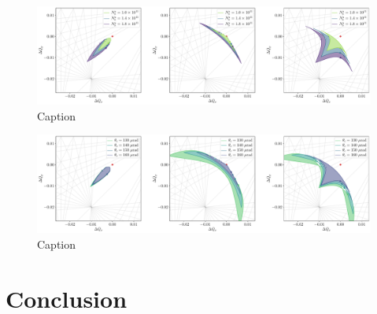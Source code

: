 \documentclass{cernatsnote}
\begin{document}
\begin{figure}[h!]
    \centering
    \includegraphics[width=\linewidth]{TeX/Figures/Nb_cmp.pdf}
    \caption{Caption}
    \label{fig:my_label}
\end{figure}

\begin{figure}[h!]
    \centering
    \includegraphics[width=\linewidth]{TeX/Figures/xing_cmp.pdf}
    \caption{Caption}
    \label{fig:my_label}
\end{figure}



\section{Conclusion}



%
%
\end{document}

